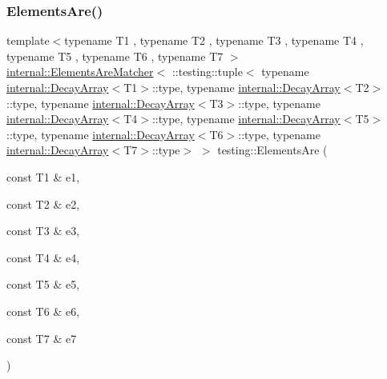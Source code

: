 \subsubsection{\texorpdfstring{Elements\+Are()}{ElementsAre()}\hspace{0.1cm}{\footnotesize\ttfamily [8/11]}}
{\footnotesize\ttfamily template$<$typename T1 , typename T2 , typename T3 , typename T4 , typename T5 , typename T6 , typename T7 $>$ \\
\hyperlink{classtesting_1_1internal_1_1_elements_are_matcher}{internal\+::\+Elements\+Are\+Matcher}$<$ \+::testing\+::tuple$<$ typename \hyperlink{structtesting_1_1internal_1_1_decay_array}{internal\+::\+Decay\+Array}$<$T1$>$\+::type, typename \hyperlink{structtesting_1_1internal_1_1_decay_array}{internal\+::\+Decay\+Array}$<$T2$>$\+::type, typename \hyperlink{structtesting_1_1internal_1_1_decay_array}{internal\+::\+Decay\+Array}$<$T3$>$\+::type, typename \hyperlink{structtesting_1_1internal_1_1_decay_array}{internal\+::\+Decay\+Array}$<$T4$>$\+::type, typename \hyperlink{structtesting_1_1internal_1_1_decay_array}{internal\+::\+Decay\+Array}$<$T5$>$\+::type, typename \hyperlink{structtesting_1_1internal_1_1_decay_array}{internal\+::\+Decay\+Array}$<$T6$>$\+::type, typename \hyperlink{structtesting_1_1internal_1_1_decay_array}{internal\+::\+Decay\+Array}$<$T7$>$\+::type$>$ $>$ testing\+::\+Elements\+Are (\begin{DoxyParamCaption}\item[{const T1 \&}]{e1,  }\item[{const T2 \&}]{e2,  }\item[{const T3 \&}]{e3,  }\item[{const T4 \&}]{e4,  }\item[{const T5 \&}]{e5,  }\item[{const T6 \&}]{e6,  }\item[{const T7 \&}]{e7 }\end{DoxyParamCaption})\hspace{0.3cm}{\ttfamily [inline]}}

\mbox{\label{namespacetesting_a8d498031827c1d089dc84f5f14b7df12}} 
